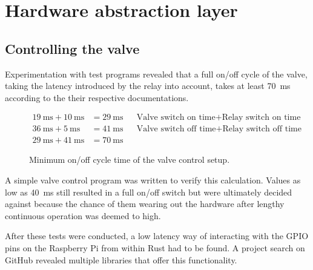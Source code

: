 \section{Hardware abstraction layer}
\author{Philip Trauner}

\subsection{Controlling the valve}
Experimentation with test programs revealed that a full on/off cycle of the valve, taking the latency introduced by the relay into account, takes at least \SI{70}{\milli\second} according to the their respective documentations. 
\begin{figure}[h]
\begin{align*}
    \SI{19}{\milli\second} + \SI{10}{\milli\second} &=\SI{29}{\milli\second} && \text{Valve switch on time} + \text{Relay switch on time} \\
    \SI{36}{\milli\second} + \SI{5}{\milli\second}  &=\SI{41}{\milli\second} && \text{Valve switch off time} + \text{Relay switch off time}\\
    \SI{29}{\milli\second} + \SI{41}{\milli\second} &=\SI{70}{\milli\second} 
\end{align*}
\caption{Minimum on/off cycle time of the valve control setup.}
\end{figure}

A simple valve control program was written to verify this calculation. Values as low as \SI{40}{\milli\second} still resulted in a full on/off switch but were ultimately decided against because the chance of them wearing out the hardware after lengthy continuous operation was deemed to high.

After these tests were conducted, a low latency way of interacting with the GPIO pins on the Raspberry Pi from within Rust had to be found. A project search on GitHub revealed multiple libraries that offer this functionality. 

